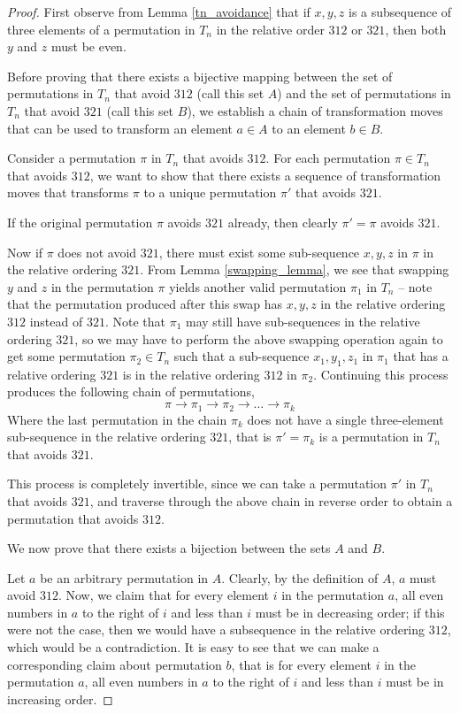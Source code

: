 \documentclass[11pt,letterpaper,twoside,english]{article}
\theoremstyle{theorem}
\theoremstyle{remark}
\begin{document}
\begin{proof}
First observe from Lemma \ref{tn_avoidance} that if $x, y, z$ is a subsequence of three elements of a permutation in $T_n$ in the relative order $312$ or $321$, then both $y$ and $z$ must be even.

Before proving that there exists a bijective mapping between the set of permutations in $T_n$ that avoid $312$ (call this set $A$) and the set of permutations in $T_n$ that avoid $321$ (call this set $B$), we establish a chain of transformation moves that can be used to transform an element $a \in A$ to an element $b \in B$.

Consider a permutation $\pi$ in $T_n$ that avoids $312$. For each permutation $\pi \in T_n$ that avoids $312$, we want to show that there exists a sequence of transformation moves that transforms $\pi$ to a unique permutation $\pi'$ that avoids $321$.

If the original permutation $\pi$ avoids $321$ already, then clearly $\pi' = \pi$ avoids $321$.

Now if $\pi$ does not avoid $321$, there must exist some sub-sequence $x, y, z$ in $\pi$ in the relative ordering $321$. From Lemma \ref{swapping_lemma}, we see that swapping $y$ and $z$ in the permutation $\pi$ yields another valid permutation $\pi_1$ in $T_n$ -- note that the permutation produced after this swap has $x, y, z$ in the relative ordering $312$ instead of $321$. Note that $\pi_1$ may still have sub-sequences in the relative ordering $321$, so we may have to perform the above swapping operation again to get some permutation $\pi_2 \in T_n$ such that a sub-sequence $x_1, y_1, z_1$ in $\pi_1$ that has a relative ordering $321$ is in the relative ordering $312$ in $\pi_2$. Continuing this process produces the following chain of permutations,
$$\pi \rightarrow \pi_1 \rightarrow \pi_2 \rightarrow \ldots \rightarrow \pi_k$$
Where the last permutation in the chain $\pi_k$ does not have a single three-element sub-sequence in the relative ordering $321$, that is $\pi' = \pi_k$ is a permutation in $T_n$ that avoids $321$.

This process is completely invertible, since we can take a permutation $\pi'$ in $T_n$ that avoids $321$, and traverse through the above chain in reverse order to obtain a permutation that avoids $312$.

We now prove that there exists a bijection between the sets $A$ and $B$. 

Let $a$ be an arbitrary permutation in $A$. Clearly, by the definition of $A$, $a$ must avoid $312$. Now, we claim that for every element $i$ in the permutation $a$, all even numbers in $a$ to the right of $i$ and less than $i$ must be in decreasing order; if this were not the case, then we would have a subsequence in the relative ordering $312$, which would be a contradiction. It is easy to see that we can make a corresponding claim about permutation $b$, that is for every element $i$ in the permutation $a$, all even numbers in $a$ to the right of $i$ and less than $i$ must be in increasing order.


\end{proof}
\end{document}
